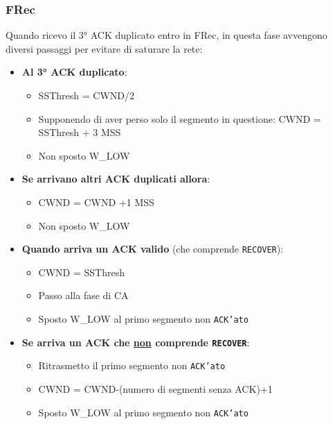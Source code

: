         \subsubsection{\Acrfull*{FRec}}
            Quando ricevo il 3° \Acrshort*{ACK} duplicato entro in \Acrlong*{FRec}, in questa fase avvengono diversi passaggi per evitare di saturare la rete: \begin{itemize}
                \item \textbf{Al 3° \Acrshort*{ACK} duplicato}:\begin{itemize}
                    \item \Acrshort*{SSThresh} = \Acrshort*{CWND}/2
                    \item Supponendo di aver perso solo il segmento in questione: \Acrshort*{CWND} = \Acrshort*{SSThresh} + 3 \Acrshort*{MSS}
                    \item Non sposto \Acrshort*{W_LOW}
                \end{itemize}
                \item \textbf{Se arrivano altri \Acrshort*{ACK} duplicati allora}: \begin{itemize}
                    \item \Acrshort*{CWND} = \Acrshort*{CWND} +1 \Acrshort*{MSS}
                    \item Non sposto \Acrshort*{W_LOW}
                \end{itemize}
                \item \textbf{Quando arriva un \Acrshort*{ACK} valido} (che comprende \texttt{RECOVER}): \begin{itemize}
                    \item \Acrshort*{CWND} = \Acrshort*{SSThresh}
                    \item Passo alla fase di \Acrlong*{CA}
                    \item Sposto \Acrshort*{W_LOW} al primo segmento non \texttt{ACK'ato}
                \end{itemize}
                \item \textbf{Se arriva un \Acrshort*{ACK} che \underline{non} comprende \texttt{RECOVER}}:\begin{itemize}
                    \item Ritrasmetto il primo segmento non \texttt{ACK'ato}
                    \item \Acrshort*{CWND} = \Acrshort*{CWND}-(numero di segmenti senza \Acrshort*{ACK})+1
                    \item Sposto \Acrshort*{W_LOW} al primo segmento non \texttt{ACK'ato}
                \end{itemize}
            \end{itemize}
            
